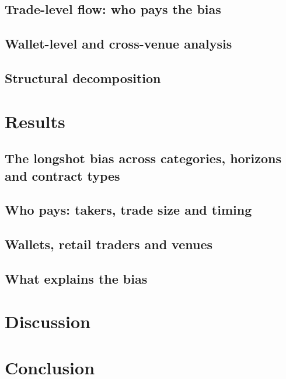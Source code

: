 \documentclass[11pt]{article}
\theoremstyle{definition}
\theoremstyle{remark}
\begin{document}
\subsection{Trade-level flow: who pays the bias}\label{sec:method-flow}

\subsection{Wallet-level and cross-venue analysis}\label{sec:method-wallets}

\subsection{Structural decomposition}\label{sec:method-structural}


\section{Results}\label{sec:results}
\subsection{The longshot bias across categories, horizons and contract types}\label{sec:res-xs}

\subsection{Who pays: takers, trade size and timing}\label{sec:res-flow}

\subsection{Wallets, retail traders and venues}\label{sec:res-wallets}

\subsection{What explains the bias}\label{sec:res-structural}


\section{Discussion}\label{sec:discussion}


\section{Conclusion}\label{sec:conclusion}

\end{document}
